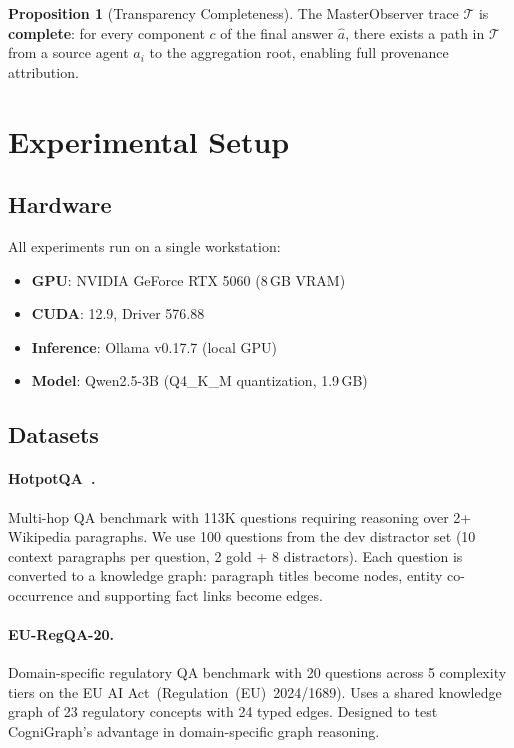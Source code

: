 \documentclass[a4paper,11pt]{article}
\theoremstyle{definition}
\newtheorem{proposition}{Proposition}[section]
\begin{document}
\begin{proposition}[Transparency Completeness]
The MasterObserver trace $\mathcal{T}$ is \textbf{complete}: for every component $c$ of the final answer $\hat{a}$, there exists a path in $\mathcal{T}$ from a source agent $a_i$ to the aggregation root, enabling full provenance attribution.
\end{proposition}

\section{Experimental Setup}
\label{sec:experiments}

\subsection{Hardware}

All experiments run on a single workstation:
\begin{itemize}
\item \textbf{GPU}: NVIDIA GeForce RTX 5060 (8\,GB VRAM)
\item \textbf{CUDA}: 12.9, Driver 576.88
\item \textbf{Inference}: Ollama v0.17.7 (local GPU)
\item \textbf{Model}: Qwen2.5-3B (Q4\_K\_M quantization, 1.9\,GB)
\end{itemize}

\subsection{Datasets}

\paragraph{HotpotQA~\cite{hotpotqa2018}.}
Multi-hop QA benchmark with 113K questions requiring reasoning over 2+ Wikipedia paragraphs.
We use 100 questions from the dev distractor set (10 context paragraphs per question, 2 gold + 8 distractors).
Each question is converted to a knowledge graph: paragraph titles become nodes, entity co-occurrence and supporting fact links become edges.

\paragraph{EU-RegQA-20.}
Domain-specific regulatory QA benchmark with 20 questions across 5 complexity tiers on the EU AI Act~(Regulation~(EU)~2024/1689).
Uses a shared knowledge graph of 23 regulatory concepts with 24 typed edges.
Designed to test CogniGraph's advantage in domain-specific graph reasoning.
\end{document}
